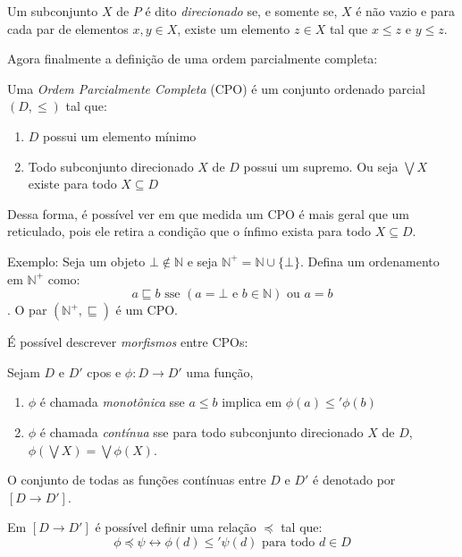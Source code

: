 \documentclass[../main.tex]{subfiles}
\begin{document}
\begin{definition}
    Um subconjunto $X$ de $P$ é dito \emph{direcionado} se, e somente se, $X$ é não vazio e para cada par de elementos $x, y \in X$, existe um elemento $z \in X$ tal que $x \leq z$ e $y \leq z$.
\end{definition}

Agora finalmente a definição de uma ordem parcialmente completa:

\begin{definition}
    Uma \emph{Ordem Parcialmente Completa} (CPO) é um conjunto ordenado parcial $(D, \leq)$ tal que:
    \begin{enumerate}
        \item $D$ possui um elemento mínimo
        \item Todo subconjunto direcionado $X$ de $D$ possui um supremo. Ou seja $\bigvee X$ existe para todo $X \subseteq D$
    \end{enumerate}
\end{definition}

Dessa forma, é possível ver em que medida um CPO é mais geral que um reticulado, pois ele retira a condição que o ínfimo exista para todo $X \subseteq D$.

Exemplo: Seja um objeto $\bot \not\in \mathbb{N}$ e seja $\mathbb{N}^+ = \mathbb{N} \cup \{\bot\}$. Defina um ordenamento em $\mathbb{N}^+$ como: $$a \sqsubseteq b \text{ sse } (a = \bot \text{ e } b \in \mathbb{N}) \text{ ou } a = b$$. O par $(\mathbb{N}^+, \sqsubseteq)$ é um CPO.

É possível descrever \emph{morfismos} entre CPOs:

\begin{definition}
    Sejam $D$ e $D'$ cpos e $\phi : D \to D'$ uma função,
    \begin{enumerate}
        \item $\phi$ é chamada \emph{monotônica} sse $a \leq b$ implica em $\phi (a) \leq' \phi (b)$
        \item $\phi$ é chamada \emph{contínua} sse para todo subconjunto direcionado $X$ de $D$, $\phi (\bigvee X) = \bigvee \phi (X)$.
    \end{enumerate}
\end{definition}

O conjunto de todas as funções contínuas entre $D$ e $D'$ é denotado por $[D \to D']$.

Em $[D \to D']$ é possível definir uma relação $\preceq$ tal que: $$\phi \preceq \psi \leftrightarrow \phi (d) \leq' \psi (d) \text{ para todo } d \in D$$
\end{document}
